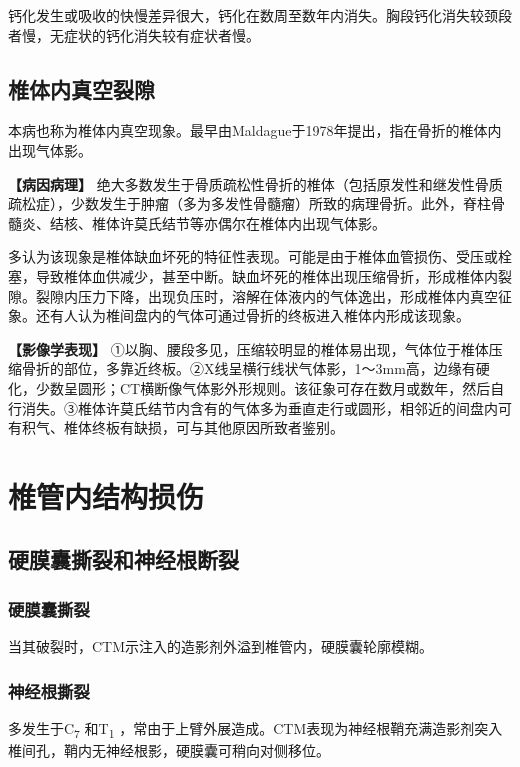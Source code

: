 钙化发生或吸收的快慢差异很大，钙化在数周至数年内消失。胸段钙化消失较颈段者慢，无症状的钙化消失较有症状者慢。

\subsection{椎体内真空裂隙}

本病也称为椎体内真空现象。最早由Maldague于1978年提出，指在骨折的椎体内出现气体影。

\textbf{【病因病理】}
绝大多数发生于骨质疏松性骨折的椎体（包括原发性和继发性骨质疏松症），少数发生于肿瘤（多为多发性骨髓瘤）所致的病理骨折。此外，脊柱骨髓炎、结核、椎体许莫氏结节等亦偶尔在椎体内出现气体影。

多认为该现象是椎体缺血坏死的特征性表现。可能是由于椎体血管损伤、受压或栓塞，导致椎体血供减少，甚至中断。缺血坏死的椎体出现压缩骨折，形成椎体内裂隙。裂隙内压力下降，出现负压时，溶解在体液内的气体逸出，形成椎体内真空征象。还有人认为椎间盘内的气体可通过骨折的终板进入椎体内形成该现象。

\textbf{【影像学表现】}
①以胸、腰段多见，压缩较明显的椎体易出现，气体位于椎体压缩骨折的部位，多靠近终板。②X线呈横行线状气体影，1～3mm高，边缘有硬化，少数呈圆形；CT横断像气体影外形规则。该征象可存在数月或数年，然后自行消失。③椎体许莫氏结节内含有的气体多为垂直走行或圆形，相邻近的间盘内可有积气、椎体终板有缺损，可与其他原因所致者鉴别。

\section{椎管内结构损伤}

\subsection{硬膜囊撕裂和神经根断裂}

\subsubsection{硬膜囊撕裂}

当其破裂时，CTM示注入的造影剂外溢到椎管内，硬膜囊轮廓模糊。

\subsubsection{神经根撕裂}

多发生于C\textsubscript{7} 和T\textsubscript{1}
，常由于上臂外展造成。CTM表现为神经根鞘充满造影剂突入椎间孔，鞘内无神经根影，硬膜囊可稍向对侧移位。


